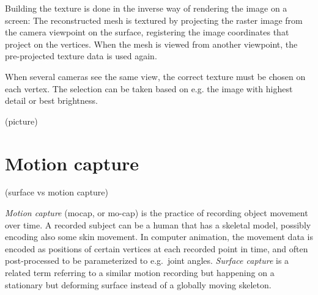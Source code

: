 Building the texture is done in the inverse way of rendering the image on a screen:
The reconstructed mesh is textured by projecting the raster image from the camera viewpoint on the surface, registering the image coordinates that project on the vertices.
When the mesh is viewed from another viewpoint, the pre-projected texture data is used again.

When several cameras see the same view, the correct texture must be chosen on each vertex.
The selection can be taken based on e.g. the image with highest detail or best brightness.


(picture)


%
%
%
%
%

\clearpage
\section{Motion capture}

(surface vs motion capture)

\emph{Motion capture} (mocap, or mo-cap) is the practice of recording object movement over time.
A recorded subject can be a human that has a skeletal model, possibly encoding also some skin movement.
In computer animation, the movement data is encoded as positions of certain vertices at each recorded point in time, and often post-processed to be parameterized to e.g.\ joint angles.
\emph{Surface capture} is a related term referring to a similar motion recording but happening on a stationary but deforming surface instead of a globally moving skeleton.

